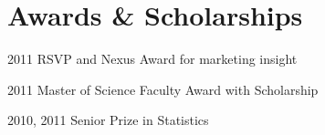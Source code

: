 \documentclass{tccv}
\begin{document}

\section{Awards \& Scholarships}

\begin{yearlist}
\item{2011}
     {RSVP and Nexus Award \newline for marketing insight}
     {}
\item{2011}
     {Master of Science Faculty Award with Scholarship}
     {}

\item{2010, 2011}
     {Senior Prize in Statistics}
     {}
\end{yearlist}

\end{document}
